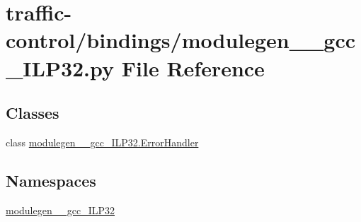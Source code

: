 \hypertarget{traffic-control_2bindings_2modulegen____gcc__ILP32_8py}{}\section{traffic-\/control/bindings/modulegen\+\_\+\+\_\+gcc\+\_\+\+I\+L\+P32.py File Reference}
\label{traffic-control_2bindings_2modulegen____gcc__ILP32_8py}
\subsection*{Classes}
\begin{DoxyCompactItemize}
\item 
class \hyperlink{classmodulegen____gcc__ILP32_1_1ErrorHandler}{modulegen\+\_\+\+\_\+gcc\+\_\+\+I\+L\+P32.\+Error\+Handler}
\end{DoxyCompactItemize}
\subsection*{Namespaces}
\begin{DoxyCompactItemize}
\item 
 \hyperlink{namespacemodulegen____gcc__ILP32}{modulegen\+\_\+\+\_\+gcc\+\_\+\+I\+L\+P32}
\end{DoxyCompactItemize}
